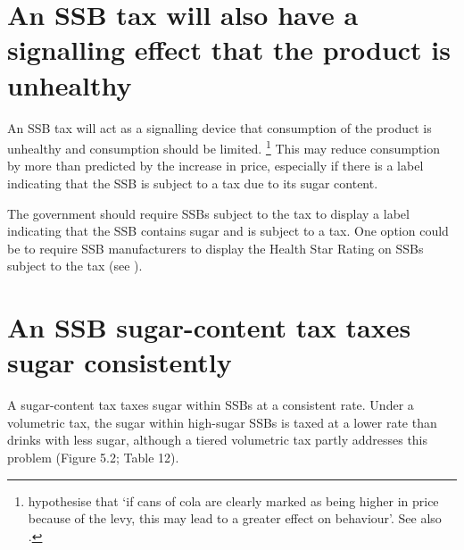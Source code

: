 \documentclass[embargoed]{grattan}
\begin{document}
\section{An SSB tax will also have a signalling effect that the product is unhealthy }\label{an-ssb-tax-will-also-have-a-signalling-effect-that-the-product-is-unhealthy}

An SSB tax will act as a signalling device that consumption of the product is unhealthy and consumption should be limited.%
\footnote{\textcite{Team2016Sugartaxhow} hypothesise that `if cans of cola are clearly marked as being higher in price because of the levy, this may lead to a greater effect on behaviour'.
See also \textcites{Yang2010Gainweightgoing}{Thow2011Taxingsoftdrinks}{Friedman2012Sugarsweetenedbeverage}{Sassi2013rolefiscalpolicies}{Thow2010effectfiscalpolicy}{Kaplin2011NationalStrategyCombat}{Kaplin2013Usingeconomicpolicy}.} This may reduce consumption by more than predicted by the increase in price, especially if there is a label indicating that the SSB is subject to a tax due to its sugar content.

The government should require SSBs subject to the tax to display a label indicating that the SSB contains sugar and is subject to a tax.
One option could be to require SSB manufacturers to display the Health Star Rating on SSBs subject to the tax (see ).

\section{An SSB sugar-content tax taxes sugar consistently}\label{an-ssb-sugar-content-tax-taxes-sugar-consistently}

A sugar-content tax taxes sugar within SSBs at a consistent rate.
Under a volumetric tax, the sugar within high-sugar SSBs is taxed at a lower rate than drinks with less sugar, although a tiered volumetric tax partly addresses this problem (Figure 5.2; Table 12).
\end{document}
